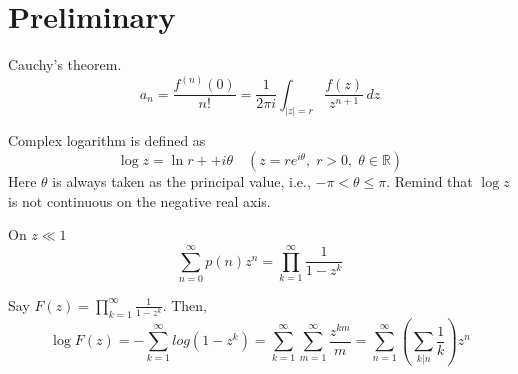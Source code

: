 \documentclass[../main.tex]{subfiles}
\begin{document}
\section{Preliminary}
\begin{theorem}
    Cauchy's theorem.
    \begin{equation}
        a_n = \frac{f^{(n)}(0)}{n!} = \frac{1}{2\pi i} \int_{|z|=r} \frac{f(z)}{z^{n+1}} \, dz
    \end{equation}
\end{theorem}

\begin{definition}
    Complex logarithm is defined as
    \begin{equation}
        \log z = \ln r + + i\theta \quad (z=re^{i\theta}, \; r>0, \; \theta \in \mathbb{R})
    \end{equation}
    Here $\theta$ is always taken as the principal value, i.e., $-\pi < \theta \leq \pi$.
    Remind that $\log z$ is not continuous on the negative real axis.
\end{definition}

On $z\ll1$
\begin{equation}
    \sum_{n=0}^{\infty} p(n) z^n = \prod_{k=1}^{\infty} \frac{1}{1-z^k}
\end{equation}

Say $F(z) = \prod_{k=1}^{\infty} \frac{1}{1-z^k}$. Then,
\begin{equation}
    \log F(z) = -\sum_{k=1}^{\infty} log(1-z^k) = \sum_{k=1}^{\infty} \sum_{m=1}^{\infty} \frac{z^{km}}{m} = \sum_{n=1}^{\infty} \left( \sum_{k|n} \frac{1}{k} \right) z^n
\end{equation}
\end{document}
